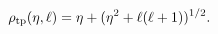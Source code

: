 \[\mathop{\rho_{\mathrm{tp}}\/}\nolimits\!\left(\eta,\ell\right)=\eta+(\eta^{2}+%
\ell(\ell+1))^{1/2}.\]